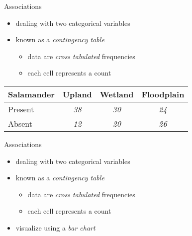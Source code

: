 \documentclass[
  ignorenonframetext,
  t]{beamer}
\providecommand{\tightlist}{%
  \setlength{\itemsep}{0pt}\setlength{\parskip}{0pt}}
\begin{document}
\begin{frame}{Associations}
\protect\hypertarget{associations-1}{}

\begin{itemize}
\tightlist
\item
  dealing with two categorical variables
\item
  known as a \emph{contingency table}

  \begin{itemize}
  \tightlist
  \item
    data are \emph{cross tabulated} frequencies
  \item
    each cell represents a count
  \end{itemize}
\end{itemize}

\vspace{0.5cm}

\centering

\begin{tabular}{lccc}
\hline     
Salamander & Upland & Wetland & Floodplain \\ \hline
Present    & \emph{38}    & \emph{30} & \emph{24} \\   
Absent   & \emph{12}    & \emph{20} & \emph{26} \\ 
\hline
\end{tabular}

\vspace{1cm}

\end{frame}

\begin{frame}{Associations}
\protect\hypertarget{associations-2}{}

\begin{itemize}
\tightlist
\item
  dealing with two categorical variables
\item
  known as a \emph{contingency table}

  \begin{itemize}
  \tightlist
  \item
    data are \emph{cross tabulated} frequencies
  \item
    each cell represents a count
  \end{itemize}
\item
  visualize using a \emph{bar chart}
\end{itemize}

\scriptsize


\end{frame}
\end{document}
